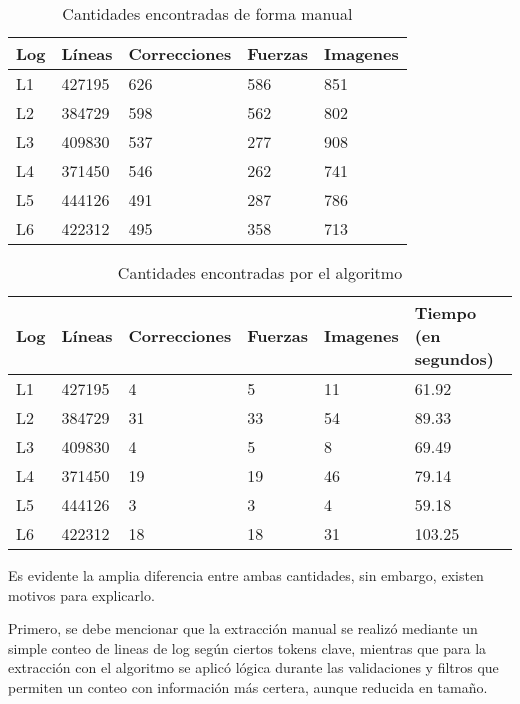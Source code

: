 \begin{table}[h]
    \centering
    \caption{\label{table:manual} Cantidades encontradas de forma manual}
    \begin{tabular}{|p{2.8cm}|p{2.8cm}|p{2.8cm}|p{2.8cm}|p{2.8cm}|}
        \hline
        Log & Líneas & Correcciones & Fuerzas & Imagenes \\
        \hline
        L1 & 427195 & 626 & 586 & 851 \\
        \hline
        L2 & 384729 & 598 & 562 & 802 \\
        \hline
        L3 & 409830 & 537 & 277 & 908 \\
        \hline
        L4 & 371450 & 546 & 262 & 741 \\
        \hline
        L5 & 444126 & 491 & 287 & 786 \\
        \hline
        L6 & 422312 & 495 & 358 & 713 \\
        \hline
    \end{tabular}
\end{table}


\begin{table}[h]
    \centering
    \caption{\label{table:auto} Cantidades encontradas por el algoritmo}
    \begin{tabular}{|p{2.3cm}|p{2.3cm}|p{2.3cm}|p{2.3cm}|p{2.3cm}|p{2.3cm}|}
        \hline
        Log & Líneas & Correcciones & Fuerzas & Imagenes & Tiempo (en segundos) \\
        \hline
        L1 & 427195 & 4 & 5 & 11 & 61.92 \\
        \hline
        L2 & 384729 & 31 & 33 & 54 & 89.33 \\
        \hline
        L3 & 409830 & 4 & 5 & 8 & 69.49 \\
        \hline
        L4 & 371450 & 19 & 19 & 46 & 79.14 \\
        \hline
        L5 & 444126 & 3 & 3 & 4 & 59.18 \\
        \hline
        L6 & 422312 & 18 & 18 & 31 & 103.25 \\
        \hline
    \end{tabular}
\end{table}

Es evidente la amplia diferencia entre ambas cantidades, sin embargo, existen motivos para explicarlo.

Primero, se debe mencionar que la extracción manual se realizó mediante un simple conteo de lineas de log según ciertos tokens clave, mientras que para la extracción con el algoritmo se aplicó lógica durante las validaciones y filtros que permiten un conteo con información más certera, aunque reducida en tamaño.


